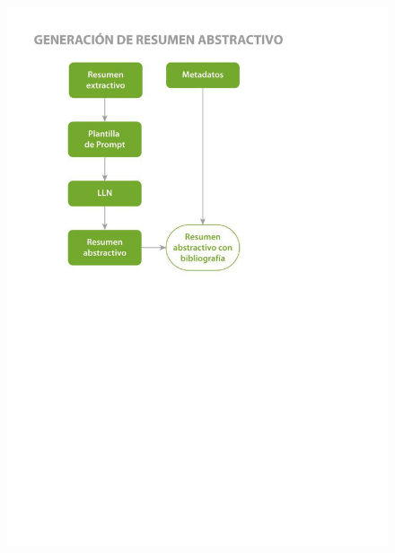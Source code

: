     \begin{figure}[H]    
        \centering
        \includegraphics[scale = 1]{Figures/pipeline_5.jpg}
        \caption*{}
    \end{figure}

